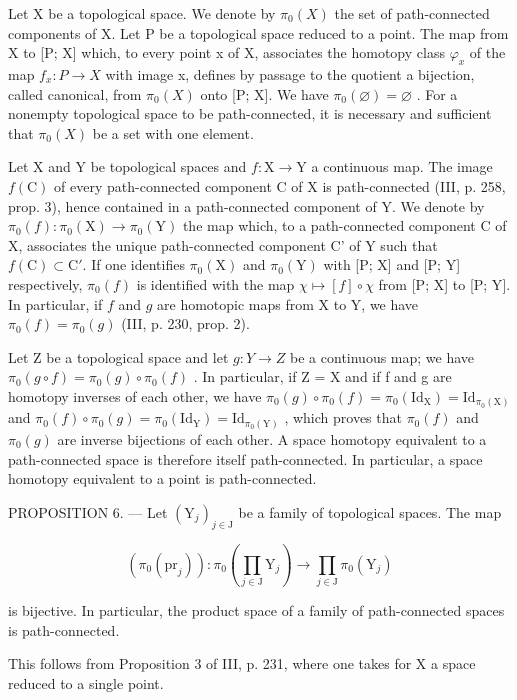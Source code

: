 Let X be a topological space. We denote by \(\pi_{0}(X)\) the set of path-connected components of X. Let P be a topological space reduced to a point. The map from X to {[}P; X{]} which, to every point x of X, associates the homotopy class \(\varphi_{x}\) of the map \(f_{x}: P \to X\) with image x, defines by passage to the quotient a bijection, called canonical, from \(\pi_{0}(X)\) onto {[}P; X{]}. We have \(\pi_{0}(\varnothing) = \varnothing\) . For a nonempty topological space to be path-connected, it is necessary and sufficient that \(\pi_{0}(X)\) be a set with one element.

Let X and Y be topological spaces and \(f\colon\mathrm{X}\to\mathrm{Y}\) a continuous map. The image \(f(\mathrm{C})\) of every path-connected component C of X is path-connected (III, p. 258, prop. 3), hence contained in a path-connected component of Y. We denote by \(\pi_{0}(f)\colon\pi_{0}(\mathrm{X})\to\pi_{0}(\mathrm{Y})\) the map which, to a path-connected component C of X, associates the unique path-connected component C' of Y such that \(f(\mathrm{C})\subset\mathrm{C}'\). If one identifies \(\pi_0(\mathrm{X})\) and \(\pi_0(\mathrm{Y})\) with {[}P; X{]} and {[}P; Y{]} respectively, \(\pi_0(f)\) is identified with the map \(\chi \mapsto [f] \circ \chi\) from {[}P; X{]} to {[}P; Y{]}. In particular, if \(f\) and \(g\) are homotopic maps from X to Y, we have \(\pi_0(f) = \pi_0(g)\) (III, p. 230, prop. 2).

Let Z be a topological space and let \(g: Y \to Z\) be a continuous map; we have \(\pi_{0}(g \circ f) = \pi_{0}(g) \circ \pi_{0}(f)\) . In particular, if Z = X and if f and g are homotopy inverses of each other, we have \(\pi_{0}(g) \circ \pi_{0}(f) = \pi_{0}(\mathrm{Id}_{\mathrm{X}}) = \mathrm{Id}_{\pi_{0}(\mathrm{X})}\) and \(\pi_{0}(f) \circ \pi_{0}(g) = \pi_{0}(\mathrm{Id}_{\mathrm{Y}}) = \mathrm{Id}_{\pi_{0}(\mathrm{Y})}\) , which proves that \(\pi_{0}(f)\) and \(\pi_{0}(g)\) are inverse bijections of each other. A space homotopy equivalent to a path-connected space is therefore itself path-connected. In particular, a space homotopy equivalent to a point is path-connected.

PROPOSITION 6. --- Let \((\mathrm{Y}_{j})_{j\in\mathrm{J}}\) be a family of topological spaces. The map

\[
(\pi_ {0} (\mathrm{pr} _ {j})) \colon \pi_ {0} (\prod_ {j \in \mathrm{J}} \mathrm{Y} _ {j}) \to \prod_ {j \in \mathrm{J}} \pi_ {0} (\mathrm{Y} _ {j})
\]

is bijective. In particular, the product space of a family of path-connected spaces is path-connected.

This follows from Proposition 3 of III, p. 231, where one takes for X a space reduced to a single point.

